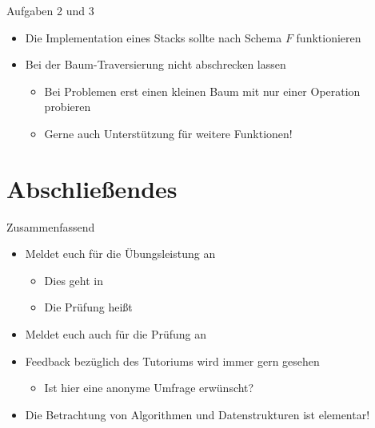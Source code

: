 \begin{frame}{Aufgaben 2 und 3}
    \begin{itemize}[<+(1)->]
        \itemsep12pt
        \item Die Implementation eines Stacks sollte nach Schema \(F\) funktionieren
        \item Bei der Baum-Traversierung nicht abschrecken lassen \begin{itemize}
            \item Bei Problemen erst einen kleinen Baum mit nur einer Operation probieren
            \item Gerne auch Unterstützung für weitere Funktionen!
        \end{itemize}
    \end{itemize}
\end{frame}
\fi

\section{Abschließendes}

{\SummaryFrame
\begin{frame}[fragile,t]{Zusammenfassend}
{}
\vfill\vfill %
\begin{itemize}[<+(1)->]
    \itemsep8pt
    \item Meldet euch für die Übungsleistung an \begin{itemize}
        \item Dies geht in 
        \item Die Prüfung heißt 
    \end{itemize}
    \item Meldet euch auch für die Prüfung an
    \item Feedback bezüglich des Tutoriums wird immer gern gesehen \begin{itemize}
        \item Ist hier eine anonyme Umfrage erwünscht?
    \end{itemize}
    \item Die Betrachtung von Algorithmen und Datenstrukturen ist elementar!
\end{itemize}
\end{frame}
}



\iffull\fi

